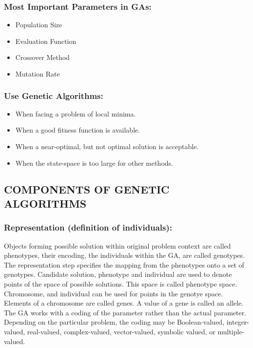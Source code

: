 \subsubsection*{Most Important Parameters in GAs:}
\begin{itemize}
	\item Population Size
	\item Evaluation Function
	\item Crossover Method
	\item Mutation Rate
\end{itemize}

\subsubsection*{Use Genetic Algorithms:}
\begin{itemize}
	\item When facing a problem of local minima.
	\item When a good fitness function is available.
	\item When a near-optimal, but not optimal solution is acceptable.
	\item When the state-space is too large for other methods.
\end{itemize}

\subsection{COMPONENTS OF GENETIC ALGORITHMS}
\subsubsection*{Representation (definition of individuals):}
Objects forming possible solution within original problem context are called phenotypes, their encoding, the individuals within the GA, are called genotypes.
The representation step specifies the mapping from the phenotypes onto a set of genotypes.
Candidate solution, phenotype and individual are used to denote points of the space of possible solutions. This space is called phenotype space.
Chromosome, and individual can be used for points in the genotye space.
Elements of a chromosome are called genes. A value of a gene is called an allele.
The GA works with a coding of the parameter rather than the actual parameter. Depending  on the particular  problem,  the  coding  may  be  Boolean-valued,  integer-valued,  real-valued,   complex-valued, vector-valued,  symbolic  valued,  or multiple-valued.

